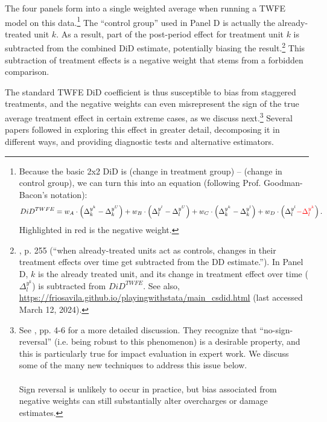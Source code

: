 \documentclass[12pt]{article}
\begin{document}
The four panels form into a single weighted average when running a TWFE model on this data.\footnote{Because the basic 2x2 DiD is (change in treatment group) – (change in control group), we can turn this into an equation (following Prof. Goodman-Bacon’s notation):
\begin{equation*}
    DiD^{TWFE} = w_A\cdot\left(\Delta_k^{y^k} - \Delta_k^{y^U}\right) + w_B\cdot\left(\Delta_l^{y^l} - \Delta_l^{y^U}\right) + w_C\cdot\left(\Delta_k^{y^k} - \Delta_k^{y^l}\right) + w_D\cdot\left(\Delta_l^{y^l} \textcolor{red}{- \Delta_l^{y^k}}\right).
\end{equation*}
Highlighted in red is the negative weight.}  The “control group” used in Panel D is actually the already-treated unit $k$. As a result, part of the post-period effect for treatment unit $k$ is subtracted from the combined DiD estimate, potentially biasing the result.\footnote{\citet{goodman-bacon2021a}, p. 255 (“when already-treated units act as controls, changes in their treatment effects over time get subtracted from the DD estimate.”). In Panel D, $k$ is the already treated unit, and its change in treatment effect over time ($\Delta_l^{y^k}$) is subtracted from $DiD^{TWFE}$. See also, \url{https://friosavila.github.io/playingwithstata/main_csdid.html} (last accessed March 12, 2024).}  This subtraction of treatment effects is a negative weight that stems from a forbidden comparison.

The standard TWFE DiD coefficient is thus susceptible to bias from staggered treatments, and the negative weights can even misrepresent the sign of the true average treatment effect in certain extreme cases, as we discuss next.\footnote{See \citet{de2023two}, pp. 4-6 for a more detailed discussion. They recognize that “no-sign-reversal” (i.e. being robust to this phenomenon) is a desirable property, and this is particularly true for impact evaluation in expert work. We discuss some of the many new techniques to address this issue below. \\\\
Sign reversal is unlikely to occur in practice, but bias associated from negative weights can still substantially alter overcharges or damage estimates.}  Several papers followed in exploring this effect in greater detail, decomposing it in different ways, and providing diagnostic tests and alternative estimators.
\end{document}
